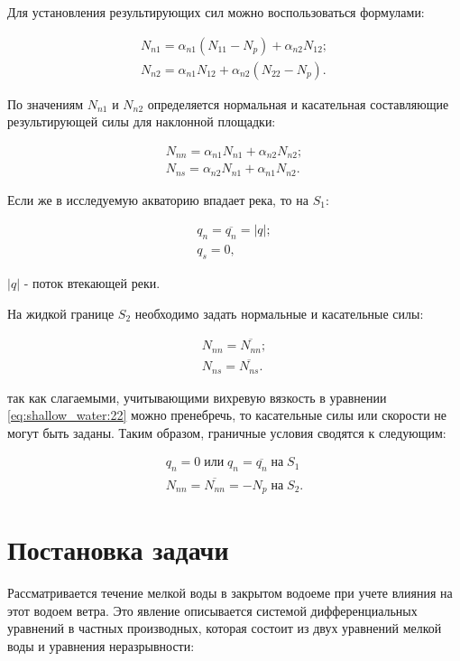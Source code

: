 \documentclass[14pt]{extreport}
\begin{document}
Для установления результирующих сил можно воспользоваться формулами:

\begin{eqnarray}
N_{n1}=\alpha_{n1}(N_{11}-N_{p})+\alpha_{n2}N_{12}; \nonumber\\
N_{n2}=\alpha_{n1}N_{12}+\alpha_{n2}(N_{22}-N_{p}).
\end{eqnarray}

По значениям $N_{n1}$ и $N_{n2}$ определяется нормальная и касательная составляющие результирующей силы для наклонной площадки:

\begin{eqnarray}
N_{nn}=\alpha_{n1}N_{n1}+\alpha_{n2}N_{n2}; \nonumber\\
N_{ns}=\alpha_{n2}N_{n1}+\alpha_{n1}N_{n2}.
\end{eqnarray}

Если же в исследуемую акваторию впадает река, то на $S_1$:

\begin{eqnarray}
q_n=\overline{q_n}=|q|; \nonumber\\
q_s=0,
\end{eqnarray}

 $|q|$ - поток втекающей
реки. 

На жидкой границе $ S_2 $ необходимо задать нормальные и касательные силы:

\begin{eqnarray}
N_{nn}=\overline{N_{nn}}; \nonumber\\
N_{ns}=\overline{N_{ns}}.
\end{eqnarray}

 так как слагаемыми, учитывающими вихревую вязкость в уравнении \eqref{eq:shallow_water:22} можно пренебречь, то касательные силы или скорости не могут быть заданы. Таким образом, граничные условия сводятся к следующим:

\begin{eqnarray}
q_n=0 \; \text{или} \; q_n=\overline{q_n} \; \text{на} \; S_1\nonumber\\
N_{nn}=\overline{N_{nn}}=-N_p \; \text{на} \; S_2.
\end{eqnarray}

\chapter{Постановка задачи}

Рассматривается течение мелкой воды в закрытом водоеме при учете влияния на этот водоем ветра. Это явление описывается системой дифференциальных уравнений в частных производных\cite{bib:calc:yurko:2004}, которая состоит из двух уравнений мелкой воды и уравнения неразрывности:
\end{document}
